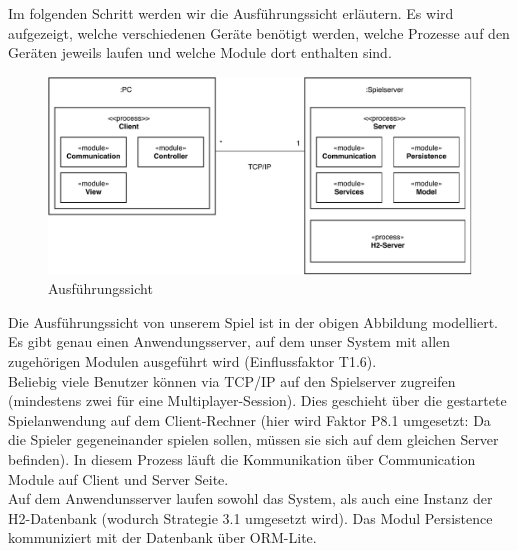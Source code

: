 \documentclass[fontsize=12pt,paper=a4,twoside]{scrartcl}
\begin{document}

Im folgenden Schritt werden wir die Ausführungssicht erläutern. Es wird aufgezeigt, welche verschiedenen Geräte benötigt werden, welche Prozesse auf den Geräten jeweils laufen und welche Module dort enthalten sind. \\

\begin{figure}[H]
\includegraphics[width=\textwidth]{UML/Ausfuehrungssicht.pdf}
 \caption{Ausführungssicht}
\end{figure}

Die Ausführungssicht von unserem Spiel ist in der obigen Abbildung modelliert. Es gibt genau einen Anwendungsserver, auf dem unser System mit allen zugehörigen Modulen ausgeführt wird (Einflussfaktor T1.6). \\

Beliebig viele Benutzer können via TCP/IP auf den Spielserver zugreifen (mindestens zwei für eine Multiplayer-Session). Dies geschieht über die gestartete Spielanwendung auf dem Client-Rechner (hier wird Faktor P8.1 umgesetzt: Da die Spieler gegeneinander spielen sollen, müssen sie sich auf dem gleichen Server befinden). In diesem Prozess läuft die Kommunikation über Communication Module auf Client und Server Seite. \\

Auf dem Anwendunsserver laufen sowohl das System, als auch eine Instanz der H2-Datenbank (wodurch Strategie 3.1 umgesetzt wird).
Das Modul Persistence kommuniziert mit der Datenbank über ORM-Lite.  \\ 
\end{document}
